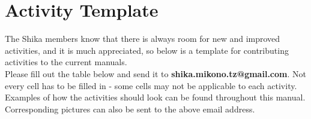 \chapter{Activity Template}
\label{cha:activity-template}

The Shika members know that there is always room for new and improved activities, and it is much appreciated, so below is a template for contributing activities to the current manuals.\\

Please fill out the table below and send it to \textbf{shika.mikono.tz@gmail.com}. Not every cell has to be filled in - some cells may not be applicable to each activity. Examples of how the activities should look can be found throughout this manual. Corresponding pictures can also be sent to the above email address.\\

